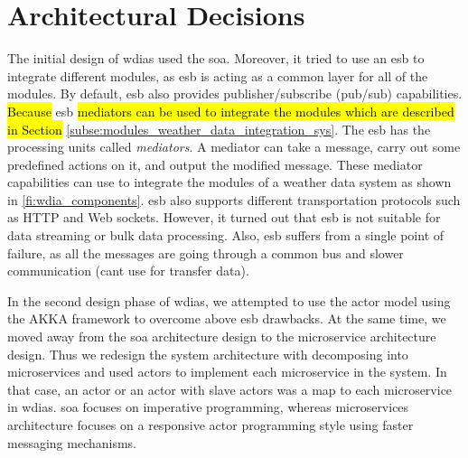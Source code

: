 \section{Architectural Decisions}
\label{se:architectural_decisions}

The initial design of \acrshort{wdias} used the \acrfull{soa}. Moreover, it tried to use an \acrfull{esb} to integrate different modules, as \acrshort{esb} is acting as a common layer for all of the modules. By default, \acrshort{esb} also provides publisher/subscribe (pub/sub) capabilities.
\hl{Because} \acrshort{esb} \hl{mediators can be used to integrate the modules which are described in Section} \ref{subse:modules_weather_data_integration_sys}. 
The \acrshort{esb} has the processing units called \emph{mediators}. A mediator can take a message, carry out some predefined actions on it, and output the modified message. These mediator capabilities can use to integrate the modules of a weather data system as shown in \cref{fi:wdia_components}. \acrshort{esb} also supports different transportation protocols such as HTTP and Web sockets. However, it turned out that \acrshort{esb} is not suitable for data streaming or bulk data processing. Also, \acrshort{esb} suffers from a single point of failure, as all the messages are going through a common bus and slower communication (cant use for transfer data).

In the second design phase of \acrshort{wdias}, we attempted to use the actor model using the AKKA framework \cite{HewittWhyModel} to overcome above \acrshort{esb} drawbacks. At the same time, we moved away from the \acrshort{soa} architecture design to the microservice architecture design. Thus we redesign the system architecture with decomposing into microservices and used actors to implement each microservice in the system. In that case, an actor or an actor with slave actors was a map to each microservice in \acrshort{wdias}. \acrshort{soa} focuses on imperative programming, whereas microservices architecture focuses on a responsive actor programming style using faster messaging mechanisms. 

